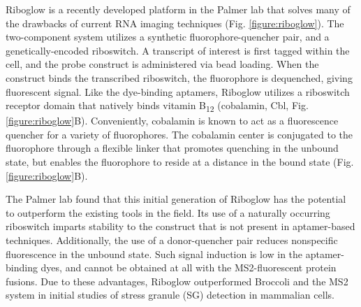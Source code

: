 Riboglow is a recently developed platform in the Palmer lab that solves many of the drawbacks of current RNA imaging techniques (Fig. \ref{figure:riboglow}).\cite{BraselmannDevelopmentriboswitchbasedplatform2017} The two-component system utilizes a synthetic fluorophore-quencher pair, and a genetically-encoded riboswitch. A transcript of interest is first tagged within the cell, and the probe construct is administered via bead loading.\cite{McNeilGlassbeadsload1987,Hayashi-TakanakaTrackingepigenetichistone2011,MorisakiRealtimequantificationsingle2016} When the construct binds the transcribed riboswitch, the fluorophore is dequenched, giving fluorescent signal. Like the dye-binding aptamers, Riboglow utilizes a riboswitch receptor domain that natively binds vitamin B\textsubscript{12} (cobalamin, Cbl, Fig. \ref{figure:riboglow}B).\cite{JohnsonJrB12cofactorsdirectly2012} Conveniently, cobalamin is known to act as a fluorescence quencher for a variety of fluorophores.\cite{RosendahlSynthesisbiologicalactivity1982,LeeDesignSynthesisCharacterization2009,SmeltzerSynthesisCharacterizationFluorescent2001} The cobalamin center is conjugated to the fluorophore through a flexible linker that promotes quenching in the unbound state, but enables the fluorophore to reside at a distance in the bound state (Fig. \ref{figure:riboglow}B).

The Palmer lab found that this initial generation of Riboglow has the potential to outperform the existing tools in the field. Its use of a naturally occurring riboswitch imparts stability to the construct that is not present in aptamer-based techniques. Additionally, the use of a donor-quencher pair reduces nonspecific fluorescence in the unbound state. Such signal induction is low in the aptamer-binding dyes, and cannot be obtained at all with the MS2-fluorescent protein fusions. Due to these advantages, Riboglow outperformed Broccoli and the MS2 system in initial studies of stress granule (SG) detection in mammalian cells.


